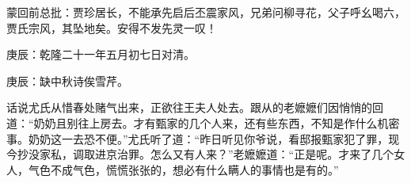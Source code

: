 \begin{parag}
    \begin{note}蒙回前总批：贾珍居长，不能承先启后丕震家风，兄弟问柳寻花，父子呼幺喝六，贾氏宗风，其坠地矣。安得不发先灵一叹！\end{note}
\end{parag}


\begin{parag}
    \begin{note}庚辰：乾隆二十一年五月初七日对清。\end{note}
\end{parag}


\begin{parag}
    \begin{note}庚辰：缺中秋诗俟雪芹。\end{note}
\end{parag}


\begin{parag}
    话说尤氏从惜春处赌气出来，正欲往王夫人处去。跟从的老嬷嬷们因悄悄的回道：“奶奶且别往上房去。才有甄家的几个人来，还有些东西，不知是作什么机密事。奶奶这一去恐不便。”尤氏听了道：“昨日听见你爷说，看邸报甄家犯了罪，现今抄没家私，调取进京治罪。怎么又有人来？”老嬷嬷道：“正是呢。才来了几个女人，气色不成气色，慌慌张张的，想必有什么瞒人的事情也是有的。”
\end{parag}


